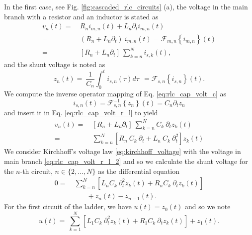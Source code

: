 In the first case, see Fig. \ref{fig:cascaded_rlc_circuits} (a), the voltage in the main branch with a resistor and an inductor is stated as
\begin{align}
	v_{n}(t) =&~ R_n i_{m,n}(t) + L_n \partial_{t} i_{m,n}(t) \nonumber \\ 
	=&~ (R_{n} + L_{n}\partial_{t}) ~ i_{m,n}(t) = \mathcal{F}_{m,n} \left\{i_{m,n}\right\}(t) \\ 
	=&~ \left[R_{n} + L_{n}\partial_{t}\right] ~ \sum_{k=n}^{N} i_{s,k}(t) \text{,} \label{eq:rlc_cap_volt_r_l}
\end{align}
and the shunt voltage is noted as
\begin{equation}
	z_{n}(t) =~ \frac{1}{C_{n}} \int_{0}^{t} i_{s,n}(\tau) d\tau ~~= \mathcal{F}_{s,n} \left\{i_{s,n}\right\}(t) \text{.} \label{eq:rlc_cap_volt_c}
\end{equation}
We compute the inverse operator mapping of Eq. \eqref{eq:rlc_cap_volt_c} as 
\begin{equation*}
	i_{s,n}(t) = \mathcal{F}_{s,n}^{-1} \left\{z_{n}\right\}(t) = C_{n} \partial_{t} z_{n}	
\end{equation*}
and insert it in Eq. \eqref{eq:rlc_cap_volt_r_l} to yield
\begin{align}
	v_{n}(t) =&~  \left[R_{n} + L_{n}\partial_{t}\right] ~ \sum_{k=n}^{N} C_{k} ~ \partial_{t} z_{k}(t) \nonumber \\
	=&~  \sum_{k=n}^{N} \left[ R_{n} ~  C_{k} ~  \partial_{t} + L_{n} ~  C_{k} ~ \partial^2_{t}\right] z_{k}(t) \label{eq:rlc_cap_volt_r_l_2}
\end{align}
We consider Kirchhoff's voltage law \eqref{eq:kirchhoff_voltage} with the voltage in main branch \eqref{eq:rlc_cap_volt_r_l_2} and so we calculate the shunt voltage for the $n$-th circuit, $n\in\{2,\ldots,N\}$ as the differential equation
\begin{align}
	0 =&~ \sum_{k=n}^{N} \left[ L_{n} C_{k} ~ \partial_{t}^2 z_{k}(t) + R_{n} C_{k} ~ \partial_{t} z_{k}(t)  \right] \nonumber \\
	&\qquad  + z_{n}(t) - z_{n-1}(t) \text{.} \label{eq:rl-c_shunt_ode_n}
\end{align}
For the first circuit of the ladder, we have $u(t) = z_{0}(t)$ and so we note
\begin{equation}
	u(t) =~ \sum_{k=1}^{N} \left[ L_{1} C_{k} ~ \partial_{t}^2 z_{k}(t) + R_{1} C_{k} ~ \partial_{t} z_{k}(t)  \right] + z_{1}(t) \text{.} \label{eq:rl-c_shunt_ode_0}
\end{equation}



